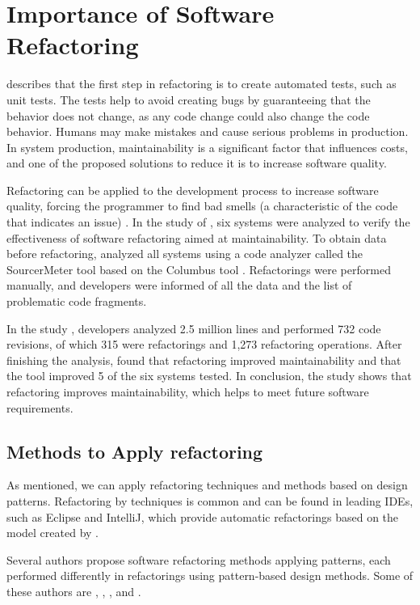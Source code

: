 \section{Importance of Software Refactoring}
\label{sec-importance}
\textcite{fowler2018refactoring} describes that the first step in refactoring is to create automated tests, such as unit tests. The tests help to avoid creating bugs by guaranteeing that the behavior does not change, as any code change could also change the code behavior. Humans may make mistakes and cause serious problems in production. In system production, maintainability is a significant factor that influences costs, and one of the proposed solutions to reduce it is to increase software quality. 

Refactoring can be applied to the development process to increase software quality, forcing the programmer to find bad smells (a characteristic of the code that indicates an issue) \cite{Wilking2007}. 
In the study of \textcite{szHoke2017empirical}, six systems were analyzed to verify the effectiveness of software refactoring aimed at maintainability. To obtain data before refactoring, \textcite{szHoke2017empirical} analyzed all systems using a code analyzer called the SourcerMeter tool based on the Columbus tool \cite{ferenc2002}. Refactorings were performed manually, and developers were informed of all the data and the list of problematic code fragments. 

In the study \textcite{szHoke2017empirical}, developers analyzed 2.5 million lines and performed 732 code revisions, of which 315 were refactorings and 1,273 refactoring operations. After finishing the analysis, \textcite{szHoke2017empirical} found that refactoring improved maintainability and that the tool improved 5 of the six systems tested. In conclusion, the study shows that refactoring improves maintainability, which helps to meet future software requirements.

\subsection{Methods to Apply refactoring}
\label{sub-methods}
As mentioned, we can apply refactoring techniques and methods based on design patterns. Refactoring by techniques is common and can be found in leading IDEs, such as Eclipse and IntelliJ, which provide automatic refactorings based on the model created by \textcite{fowler2018refactoring}. 

Several authors propose software refactoring methods applying patterns, each performed differently in refactorings using pattern-based design methods. Some of these authors are \textcite{liu2014automated}, \textcite{zafeiris2017automated}, \textcite{cinneide2000automated}, and \cite{ouni2017more}. 

